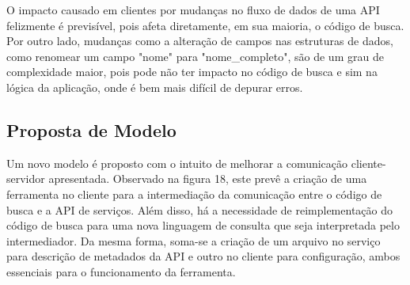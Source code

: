 \documentclass[12pt]{article}
\begin{document}
O impacto causado em clientes por mudanças no fluxo de dados de uma API felizmente é previsível, pois afeta diretamente, em sua maioria, o código de busca. Por outro lado, mudanças como a alteração de campos nas estruturas de dados, como renomear um campo "nome" para "nome\_completo", são de um grau de complexidade maior, pois pode não ter impacto no código de busca e sim na lógica da aplicação, onde é bem mais difícil de depurar erros.

  \subsection{Proposta de Modelo}

  Um novo modelo é proposto com o intuito de melhorar a comunicação cliente-servidor apresentada. Observado na figura 18, este prevê a criação de uma ferramenta no cliente para a intermediação da comunicação entre o código de busca e a API de serviços. Além disso, há a necessidade de reimplementação do código de busca para uma nova linguagem de consulta que seja interpretada pelo intermediador. Da mesma forma, soma-se a criação de um arquivo no serviço para descrição de metadados da API e outro no cliente para configuração, ambos essenciais para o funcionamento da ferramenta.
\end{document}

